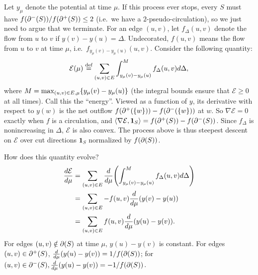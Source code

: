 \documentclass[12 pt]{article}
\begin{document}
Let $y_\mu$ denote the potential at time $\mu$. If this process ever stops,
every $S$ must have $f(\incut{S})/f(\outcut{S}) \leq 2$ (i.e.\ we have a
$2$-pseudo-circulation), so we just need to argue that we terminate. For an edge
$(u, v)$, let $f_\Delta(u, v)$ denote the flow from $u$ to $v$ if
$y(v) - y(u) = \Delta$. Undecorated, $f(u, v)$ means the flow from $u$ to $v$ at
time $\mu$, i.e.\ $f_{y_\mu(v)-y_\mu(u)}(u, v)$. Consider the following
quantity:
\begin{align*}
  \mathcal{E}(\mu) \overset{\text{def}}{=} \sum_{(u, v) \in E} \int_{y_\mu(v)-y_\mu(u)}^M f_\Delta(u, v) d\Delta,
\end{align*}
where $M = \max_{(u, v) \in E, \mu}\Set{y_\mu(v) - y_\mu(u)}$ (the integral
bounds ensure that $\mathcal{E} \geq 0$ at all times). Call this the ``energy''.
Viewed as a function of $y$, its derivative with respect to $y(w)$ is the net
outflow $f(\outcut{\Set{w}}) - f(\incut{\Set{w}})$ at $w$. So
$\nabla \mathcal{E} = 0$ exactly when $f$ is a circulation, and
$\langle \nabla \mathcal{E}, \mathbf{1}_S \rangle = f(\outcut{S}) - f(\incut{S})$.
Since $f_\Delta$ is nonincreasing in $\Delta$, $\mathcal{E}$ is also convex. The
process above is thus steepest descent on $\mathcal{E}$ over cut directions
$\mathbf{1}_S$ normalized by $f(\cut{S})$.

How does this quantity evolve?
\begin{align*}
  \frac{d\mathcal{E}}{d\mu} & = \sum_{(u, v) \in E} \frac{d}{d\mu}\paren{\int_{y_\mu(v)-y_\mu(u)}^{M} f_\Delta(u, v) d\Delta} \\
                            & = \sum_{(u, v) \in E} -f(u, v)\frac{d}{d\mu}\paren{y(v) - y(u)}                                 \\
                            & = \sum_{(u, v) \in E} f(u, v)\frac{d}{d\mu}\paren{y(u) - y(v)}.
\end{align*}
For edges $(u, v) \notin \cut{S}$ at time $\mu$, $y(u) - y(v)$ is constant. For
edges $(u, v) \in \outcut{S}$, $\frac{d}{d\mu}(y(u) - y(v)) = 1/f(\cut{S})$; for
$(u, v) \in \incut{S}, \frac{d}{d\mu}(y(u) - y(v)) = -1/f(\cut{S})$.
\end{document}
